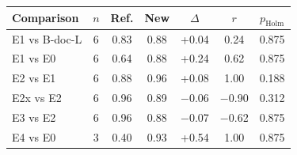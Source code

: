 \begin{tabular}{@{}lcccccc@{}}
\toprule
Comparison & $n$ & Ref. & New & $\Delta$ & $r$ & $p_\mathrm{Holm}$ \\
\midrule
E1 vs B-doc-L & 6 & 0.83 & 0.88 & +0.04 & 0.24 & 0.875 \\
E1 vs E0 & 6 & 0.64 & 0.88 & +0.24 & 0.62 & 0.875 \\
E2 vs E1 & 6 & 0.88 & 0.96 & +0.08 & 1.00 & 0.188 \\
E2x vs E2 & 6 & 0.96 & 0.89 & $-$0.06 & $-$0.90 & 0.312 \\
E3 vs E2 & 6 & 0.96 & 0.88 & $-$0.07 & $-$0.62 & 0.875 \\
E4 vs E0 & 3 & 0.40 & 0.93 & +0.54 & 1.00 & 0.875 \\
\bottomrule
\end{tabular}
